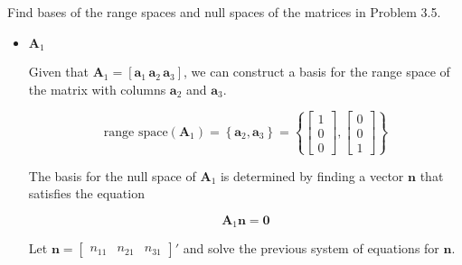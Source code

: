 \item [3.6] Find bases of the range spaces and null spaces
of the matrices in Problem 3.5.

\begin{itemize}
 \item $\mathbf{A}_1$

 Given that $\mathbf{A}_1 = [\mathbf{a}_1 \,
\mathbf{a}_2 \, \mathbf{a}_3 ]$, we can construct a basis
for the range space of the matrix with columns
$\mathbf{a}_2$ and $\mathbf{a}_3$.

\begin{equation*}
\text{range space}(\mathbf{A}_1) =
\left \{ \mathbf{a}_2 , \mathbf{a}_3 \right \} =
\left \{ \begin{bmatrix} 1 \\ 0 \\ 0  \end{bmatrix},
\begin{bmatrix} 0\\ 0\\ 1 \end{bmatrix}
\right \}
\end{equation*}

The basis for the null space of $\mathbf{A}_1$ is determined
by finding a vector $\mathbf{n}$ that satisfies the equation

\begin{equation*} \mathbf{A}_1 \mathbf{n} = \mathbf{0}
\end{equation*}

Let $\mathbf{n} = \begin{bmatrix} n_{11} & n_{21} & n_{31}
\end{bmatrix}'$ and solve the previous system of equations
for $\mathbf{n}$.


\end{itemize}
